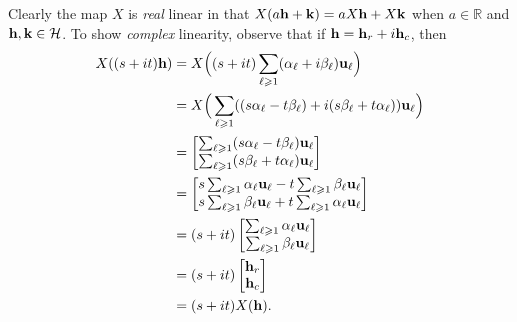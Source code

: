 \documentclass{dis}
\theoremstyle{plain}
\theoremstyle{definition}
\def\R{\mathbb{R}}
\renewcommand{\geq}{\geqslant}
\renewcommand{\vec}[1]{{\bf #1}}
\newcommand{\0}{{\color{lightgray}0}}
\begin{document}
Clearly the map $X$ is {\em real} linear in that $X(a \vec{h} + \vec{k}) = a X \vec{h} + X \vec{k}$ when $a \in \R$ and $\vec{h}, \vec{k} \in \mathcal{H}$. To show {\em complex} linearity, observe that if $\vec{h} = \vec{h}_{r} + i \vec{h}_c$, then
\begin{align*}
X ((s + i t) \vec{h}) & = X \Big((s + i t) \sum_{\ell \geq 1} (\alpha_{\ell} + i \beta_{\ell}) \vec{u}_{\ell}\Big)\\
& = X \Big(\sum_{\ell \geq 1}  ((s \alpha_{\ell} - t \beta_{\ell}) +  i (s \beta_{\ell} + t \alpha_{\ell}))\vec{u}_{\ell}\Big)\\
& = \begin{bmatrix} \sum_{\ell \geq 1} (s \alpha_{\ell} - t \beta_{\ell}) \vec{u}_{\ell}\\\sum_{\ell \geq 1} (s \beta_{\ell} + t \alpha_{\ell}) \vec{u}_{\ell}\end{bmatrix}\\
& = \begin{bmatrix}s \sum_{\ell \geq 1} \alpha_{\ell} \vec{u}_{\ell} - t \sum_{\ell \geq 1} \beta_{\ell} \vec{u}_{\ell}\\  s \sum_{\ell \geq 1} \beta_{\ell} \vec{u}_{\ell} + t \sum_{\ell \geq 1} \alpha_{\ell} \vec{u}_{\ell}\end{bmatrix}\\
& = (s + i t) \begin{bmatrix} \sum_{\ell \geq 1} \alpha_{\ell} \vec{u}_{\ell}\\ \sum_{\ell \geq 1} \beta_{\ell} \vec{u}_{\ell}\end{bmatrix}\\
& = (s + i t) \begin{bmatrix}\vec{h}_{r}\\ \vec{h}_{c}\end{bmatrix}\\
& = (s + i t) X( \vec{h}).
\end{align*}
\end{document}
